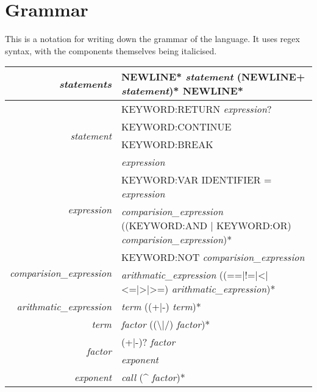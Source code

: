 \chapter{Grammar}

This is a notation for writing down the grammar of the language.  It uses regex syntax, with the components themselves being italicised.

\begin{tabular}{|r|l|}
\hline
\textit{statements} & NEWLINE* \textit{statement} (NEWLINE+ \textit{statement})* NEWLINE* \\\hline

\multirow{4}{*}{\textit{statement}} & KEYWORD:RETURN \textit{expression}? \\
                                    & KEYWORD:CONTINUE \\
                                    & KEYWORD:BREAK \\
                                    & \textit{expression} \\\hline
                                    
\multirow{2}{*}{\textit{expression}} & KEYWORD:VAR IDENTIFIER = \textit{expression} \\
                                     & \makecell{\textit{comparision\_expression} ((KEYWORD:AND | KEYWORD:OR)\\ \textit{comparision\_expression})*} \\\hline

\multirow{2}{*}{\textit{comparision\_expression}} & KEYWORD:NOT \textit{comparision\_expression} \\
                                                  & \textit{arithmatic\_expression} ((==|!=|<|<=|>|>=) \textit{arithmatic\_expression})* \\\hline

\textit{arithmatic\_expression} & \textit{term} ((+|-) \textit{term})* \\\hline

\textit{term} & \textit{factor} ((\textbackslash*|/) \textit{factor})* \\\hline

\multirow{2}{*}{\textit{factor}} & (+|-)? \textit{factor} \\
                                 & \textit{exponent} \\\hline

\textit{exponent} & \textit{call} (\^{} \textit{factor})* \\\hline
\end{tabular}
